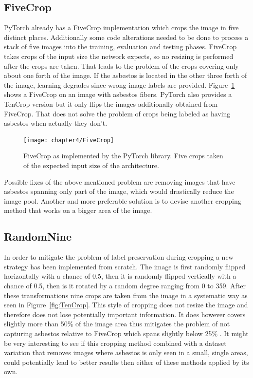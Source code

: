 \subsection{FiveCrop}

PyTorch already has a FiveCrop implementation which crops the image in five distinct places. Additionally some code alterations needed to be done to process a stack of five images into the training, evaluation and testing phases. FiveCrop takes crops of the input size the network expects, so no resizing is performed after the crops are taken. That leads to the problem of the crops covering only about one forth of the image. If the asbestos is located in the other three forth of the image, learning degrades since wrong image labels are provided. Figure~\ref{fig:FiveCrop} shows a FiveCrop on an image with asbestos fibers. PyTorch also provides a TenCrop version but it only flips the images additionally obtained from FiveCrop. That does not solve the problem of crops being labeled as having asbestos when actually they don't.

\begin{figure}[!h]
  \centering
  \caption{FiveCrop as implemented by the PyTorch library. Five crops taken of the expected input size of the architecture.}
  \texttt{[image: chapter4/FiveCrop]}
  \label{fig:FiveCrop}
\end{figure}

Possible fixes of the above mentioned problem are removing images that have asbestos spanning only part of the image, which would drastically reduce the image pool. Another and more preferable solution is to devise another cropping method that works on a bigger area of the image.

\subsection{RandomNine}

In order to mitigate the problem of label preservation during cropping a new strategy has been implemented from scratch. The image is first randomly flipped horizontally with a chance of 0.5, then it is randomly flipped vertically with a chance of 0.5, then is it rotated by a random degree ranging from 0 to 359. After these transformations nine crops are taken from the image in a systematic way as seen in Figure~\ref{fig:TenCrop}. This style of cropping does not resize the image and therefore does not lose potentially important information. It does however covers slightly more than 50\% of the image area thus mitigates the problem of not capturing asbestos relative to FiveCrop which spans slightly below 25\% . It might be very interesting to see if this cropping method combined with a dataset variation that removes images where asbestos is only seen in a small, single areas, could potentially lead to better results then either of these methods applied by its own.

